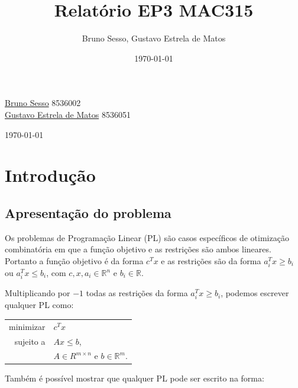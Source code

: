 \documentclass[12pt]{article}
\title{Relatório EP3 MAC315}
\author{Bruno Sesso, Gustavo Estrela de Matos}
\date{\today}
\begin{document}
\begin{titlepage}

\begin{center}
	\begin{flushleft}
    	\textcolor{title_color} {
        	\fontsize{1cm}{1em}\selectfont {Implementação do Método Simplex\\}
    	}
    \end{flushleft}
  
    \begin{flushleft}{
    \textcolor{text_color} {
    	\href{mailto:bsesso@gmail.com}{Bruno Sesso} 8536002\\    					      		           \href{mailto:estrela.gustavo.matos@gmail.com}{Gustavo Estrela de Matos} 8536051\\}
    }
    \end{flushleft}
   
	\today
\end{center}
\end{titlepage}

\newpage
\section{Introdução}



\subsection{Apresentação do problema}
    Os problemas de Programação Linear (PL) são casos específicos de otimização combinatória em que a função objetivo e as restrições são ambos lineares. Portanto a função objetivo é da forma $c^{T}x$ e as restrições são da forma $a_{i}^{T}x \geq b_{i}$ ou $a_{i}^{T}x \leq b_{i}$, com $c, x, a_i \in \mathbb{R}^{n}$ e $b_{i} \in \mathbb{R}$.
    
    Multiplicando por $-1$ todas as restrições da forma $a_{i}^{T}x \geq b_i$, podemos escrever qualquer PL como:

    \begin{center}
    	\begin{tabular}{r l}
        	minimizar & $c^Tx$ \\
        
	        sujeito a & $Ax \leq b$, \\
        
        			  & $A \in R^{m \times n}$ e $b \in \mathbb{R}^m$.
		\end{tabular}
    \end{center}
	Também é possível mostrar que qualquer PL pode ser escrito na forma: 
\end{document}
